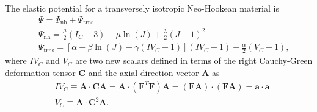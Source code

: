 \documentclass[12pt,aps,pre]{revtex4}
\begin{document}
The elastic potential for a transversely isotropic Neo-Hookean material is \cite{Bonet:1998vc}
%
\begin{align}
&\Psi = \Psi_{\text{nh}} + \Psi_{\text{trns}} \nonumber\\ \ \
&\Psi_{\text{nh}} = \frac{\mu}{2}\left(I_C - 3\right) - \mu \ln(J) + \frac{\lambda}{2}\left(J - 1\right)^2 \nonumber\\ \ \
&\Psi_{\text{trns}} = \left[ \alpha + \beta \ln(J) + \gamma (IV_C - 1)\right] (IV_C - 1) - \frac{\alpha}{2}\left(V_C - 1\right), 
\label{eq:psi_trns_iso}
\end{align}
%
where $IV_C$ and $V_C$ are two new scalars defined in terms of the right Cauchy-Green deformation tensor $\pmb{C}$ and the axial direction vector $\pmb{A}$ as
%
\begin{align}
&IV_C \equiv \pmb{A} \cdot \pmb{C} \pmb{A} = \pmb{A}\cdot(\pmb{F}^T\pmb{F})\pmb{A} = (\pmb{F}\pmb{A})\cdot(\pmb{F}\pmb{A}) = \pmb{a} \cdot \pmb{a} \nonumber\\
&V_C \equiv \pmb{A} \cdot \pmb{C}^2 \pmb{A} .
\label{eq:invariants_trns_iso}
\end{align}
%
\end{document}
